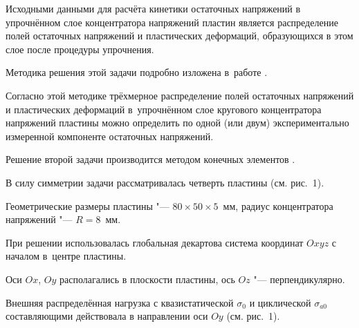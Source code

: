Исходными данными для расчёта кинетики остаточных напряжений в упрочнённом слое концентратора напряжений пластин является распределение полей остаточных напряжений и пластических деформаций, образующихся в этом слое после процедуры упрочнения. 

Методика решения этой задачи подробно изложена в~работе  \cite{dubovova:8}.

Согласно этой методике трёхмерное распределение полей остаточных напряжений и пластических деформаций в~упрочнённом слое кругового концентратора напряжений пластины можно определить по одной (или двум) экспериментально измеренной компоненте остаточных напряжений. 



\smallskip 







Решение второй задачи производится методом конечных элементов \cite{dubovova:4, dubovova:5}.

%






В силу симметрии задачи рассматривалась четверть пластины (см. рис.~1).

Геометрические размеры пластины "--- $80 \times 50\times 5$~мм, радиус концентратора напряжений "--- $R=8$~мм.

При решении использовалась глобальная декартова система координат $Oxyz$ с началом в~центре пластины. 

Оси $Ox$, $Oy$ располагались в плоскости пластины, ось $Oz$ "--- перпендикулярно.

Внешняя распределённая нагрузка с квазистатической $\sigma_{0}$ и циклической $\sigma_{a0}$ составляющими действовала в направлении оси $Oy$ (см. рис.~1).





%

